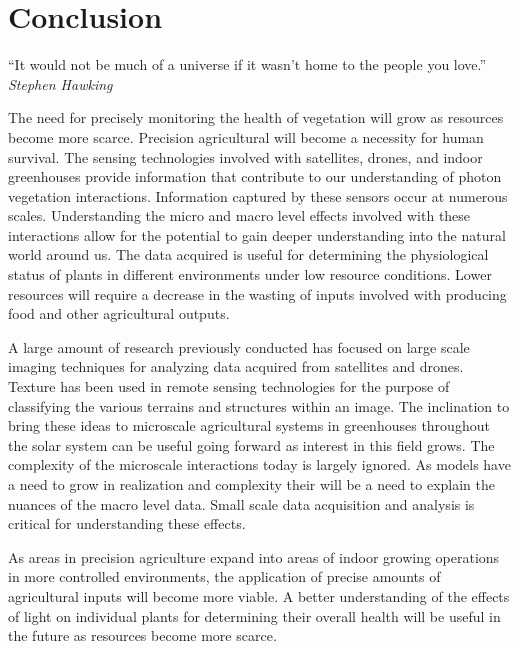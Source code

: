 \chapter{Conclusion}
\begin{center}
  \begin{minipage}{0.75\textwidth}
    \begin{small}
      “It would not be much of a universe if it wasn't home to the people you love.”\\
      \null\hfill\emph{Stephen Hawking}
    \end{small}
  \end{minipage}
  \vspace{0.5cm}
\end{center}

The need for precisely monitoring the health of vegetation will grow as resources become more scarce.  Precision agricultural will become a necessity for human survival. The sensing technologies involved with satellites, drones, and indoor greenhouses provide information that contribute to our understanding of photon vegetation interactions. Information captured by these sensors occur at numerous scales. Understanding the micro and macro level effects involved with these interactions allow for the potential to gain deeper understanding into the natural world around us. The data acquired is useful for determining the physiological status of plants in different environments under low resource conditions. Lower resources will require a decrease in the wasting of inputs involved with producing food and other agricultural outputs.

A large amount of research previously conducted has focused on large scale imaging techniques for analyzing data acquired from satellites and drones.  Texture has been used in remote sensing technologies for the purpose of classifying the various terrains and structures within an image.  The inclination to bring these ideas to microscale agricultural systems in greenhouses throughout the solar system can be useful going forward as interest in this field grows.  The complexity of the microscale interactions today is largely ignored.  As models have a need to grow in realization and complexity their will be a need to explain the nuances of the macro level data.  Small scale data acquisition and analysis is critical for understanding these effects.

As areas in precision agriculture expand into areas of indoor growing operations in more controlled environments, the application of precise amounts of agricultural inputs will become more viable.  A better understanding of the effects of light on individual plants for determining their overall health will be useful in the future as resources become more scarce.

